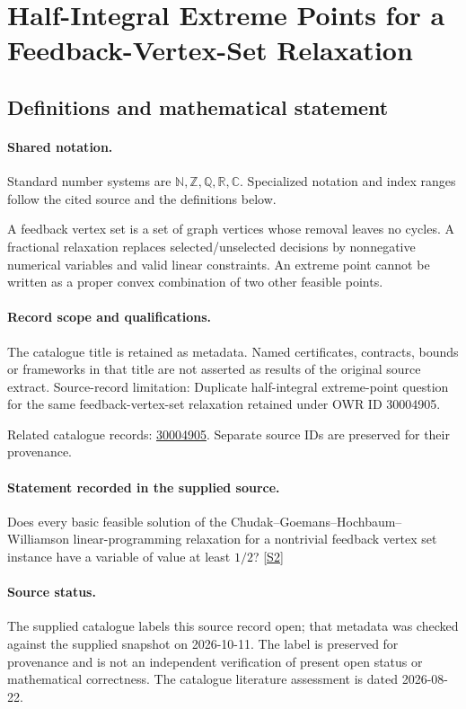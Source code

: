 \documentclass[11pt]{article}
\newcommand{\sref}[2]{\hyperlink{source:#1:#2}{[S#2]}}
\begin{document}
\section{Half-Integral Extreme Points for a Feedback-Vertex-Set Relaxation}\label{statement}

\subsection{Definitions and mathematical statement}

\paragraph{Shared notation.}Standard number systems are $\mathbb N,\mathbb Z,\mathbb Q,\mathbb R,\mathbb C$. Specialized notation and index ranges follow the cited source and the definitions below.


A feedback vertex set is a set of graph vertices whose removal leaves no cycles. A fractional relaxation replaces selected/unselected decisions by nonnegative numerical variables and valid linear constraints. An extreme point cannot be written as a proper convex combination of two other feasible points.
\paragraph{Record scope and qualifications.}
The catalogue title is retained as metadata. Named certificates, contracts, bounds or frameworks in that title are not asserted as results of the original source extract.
Source-record limitation: Duplicate half-integral extreme-point question for the same feedback-vertex-set relaxation retained under OWR ID 30004905.

Related catalogue records: \href{https://mehmetmars7.github.io/Erdosproblems-llm-hunter/problem.html?type=open_problems&id=30004905}{30004905}. Separate source IDs are preserved for their provenance.
\paragraph{Statement recorded in the supplied source.}
Does every basic feasible solution of the Chudak–Goemans–Hochbaum–Williamson linear-programming relaxation for a nontrivial feedback vertex set instance have a variable of value at least $1/2$? \sref{statement}{2}
\paragraph{Source status.}
The supplied catalogue labels this source record open; that metadata was checked against the supplied snapshot on 2026-10-11. The label is preserved for provenance and is not an independent verification of present open status or mathematical correctness. The catalogue literature assessment is dated 2026-08-22.
\end{document}
